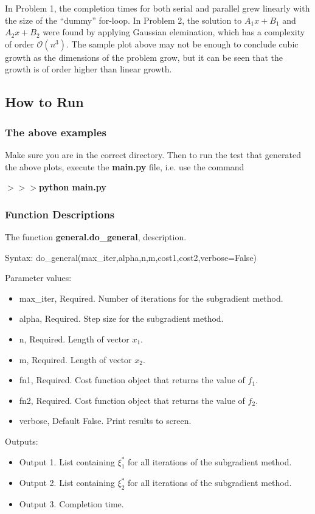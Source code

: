 \documentclass[12pt]{article}
\begin{document}
In Problem 1, the completion times for both serial and parallel grew linearly with the size of the ``dummy'' for-loop. In Problem 2, the solution to $A_1x+B_1$ and $A_2x+B_2$ were found by applying Gaussian elemination, which has a complexity of order $\mathcal{O}(n^3)$. The sample plot above may not be enough to conclude cubic growth as the dimensions of the problem grow, but it can be seen that the growth is of order higher than linear growth.


\subsection*{How to Run}

\subsubsection*{The above examples}

Make sure you are in the correct directory. Then to run the test that generated the above plots, execute the \textbf{main.py} file, i.e. use the command

\noindent \textbf{$>>>$python main.py}

\subsubsection*{Function Descriptions}

\noindent The function \textbf{general.do\_general}, description.

Syntax: do\_general(max\_iter,alpha,n,m,cost1,cost2,verbose=False)

Parameter values:
\begin{itemize}
	\item max\_iter, Required. Number of iterations for the subgradient method.
	\item alpha, Required. Step size for the subgradient method.
	\item n, Required. Length of vector $x_1$.
	\item m, Required. Length of vector $x_2$.
	\item fn1, Required. Cost function object that returns the value of $f_1$.
	\item fn2, Required. Cost function object that returns the value of $f_2$. 
	\item verbose, Default False. Print results to screen.
\end{itemize}

Outputs:
\begin{itemize}
	\item Output 1. List containing $\xi_1^*$ for all iterations of the subgradient method.
	\item Output 2. List containing $\xi_2^*$ for all iterations of the subgradient method.
	\item Output 3. Completion time.
\end{itemize}
\end{document}
